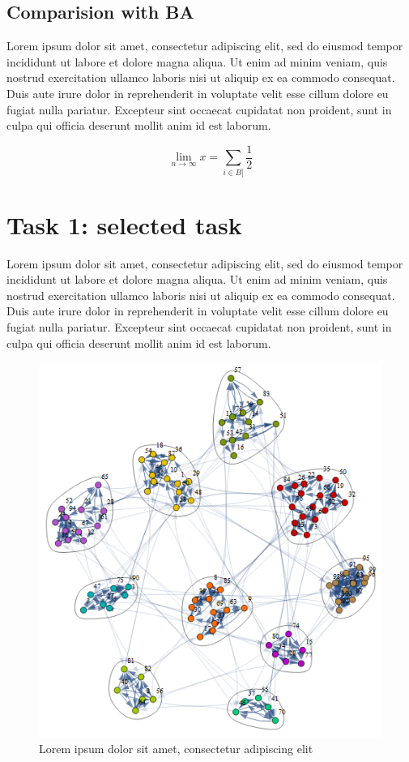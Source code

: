 \documentclass[sigchi]{acmart}
\begin{document}
\subsection{Comparision with BA}

Lorem ipsum dolor sit amet, consectetur adipiscing elit, sed do eiusmod tempor incididunt ut labore et dolore magna aliqua. Ut enim ad minim veniam, quis nostrud exercitation ullamco laboris nisi ut aliquip ex ea commodo consequat. Duis aute irure dolor in reprehenderit in voluptate velit esse cillum dolore eu fugiat nulla pariatur. Excepteur sint occaecat cupidatat non proident, sunt in culpa qui officia deserunt mollit anim id est laborum.

\begin{equation}
  \lim_{n\rightarrow \infty}x= \sum_{i\in B]}\frac{1}{2}
\end{equation}




\section{Task 1: selected task}

Lorem ipsum dolor sit amet, consectetur adipiscing elit, sed do eiusmod tempor incididunt ut labore et dolore magna aliqua. Ut enim ad minim veniam, quis nostrud exercitation ullamco laboris nisi ut aliquip ex ea commodo consequat. Duis aute irure dolor in reprehenderit in voluptate velit esse cillum dolore eu fugiat nulla pariatur. Excepteur sint occaecat cupidatat non proident, sunt in culpa qui officia deserunt mollit anim id est laborum.

\begin{figure}[h]
  \centering
  \includegraphics[width=\linewidth]{img/example_fig}
  \caption{Lorem ipsum dolor sit amet, consectetur adipiscing elit}
  \label{fig:example}
\end{figure}
\end{document}
